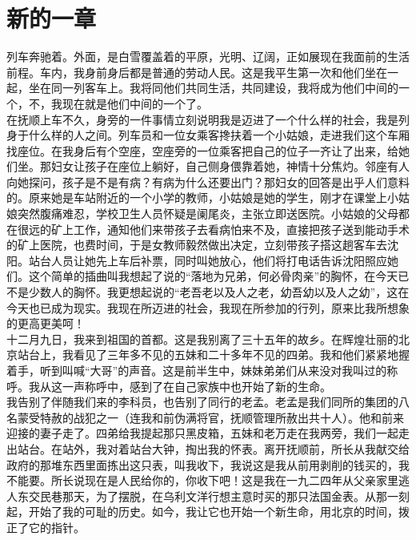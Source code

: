 \fancyhead[RO]{} %
\fancyhead[LE]{} %
\chapter*{新的一章}
\thispagestyle{empty}
列车奔驰着。外面，是白雪覆盖着的平原，光明、辽阔，正如展现在我面前的生活前程。车内，我身前身后都是普通的劳动人民。这是我平生第一次和他们坐在一起，坐在同一列客车上。我将同他们共同生活，共同建设，我将成为他们中间的一个，不，我现在就是他们中间的一个了。\\

在抚顺上车不久，身旁的一件事情立刻说明我是迈进了一个什么样的社会，我是列身于什么样的人之间。列车员和一位女乘客搀扶着一个小姑娘，走进我们这个车厢找座位。在我身后有个空座，空座旁的一位乘客把自己的位子一齐让了出来，给她们坐。那妇女让孩子在座位上躺好，自己侧身偎靠着她，神情十分焦灼。邻座有人向她探问，孩子是不是有病？有病为什么还要出门？那妇女的回答是出乎人们意料的。原来她是车站附近的一个小学的教师，小姑娘是她的学生，刚才在课堂上小姑娘突然腹痛难忍，学校卫生人员怀疑是阑尾炎，主张立即送医院。小姑娘的父母都在很远的矿上工作，通知他们来带孩子去看病怕来不及，直接把孩子送到能动手术的矿上医院，也费时间，于是女教师毅然做出决定，立刻带孩子搭这趟客车去沈阳。站台人员让她先上车后补票，同时叫她放心，他们将打电话告诉沈阳照应她们。这个简单的插曲叫我想起了说的“落地为兄弟，何必骨肉亲”的胸怀，在今天已不是少数人的胸怀。我更想起说的“老吾老以及人之老，幼吾幼以及人之幼”，这在今天也已成为现实。我现在所迈进的社会，我现在所参加的行列，原来比我所想象的更高更美呵！\\

十二月九日，我来到祖国的首都。这是我别离了三十五年的故乡。在辉煌壮丽的北京站台上，我看见了三年多不见的五妹和二十多年不见的四弟。我和他们紧紧地握着手，听到叫喊“大哥”的声音。这是前半生中，妹妹弟弟们从来没对我叫过的称呼。我从这一声称呼中，感到了在自己家族中也开始了新的生命。\\

我告别了伴随我们来的李科员，也告别了同行的老孟。老孟是我们同所的集团的八名蒙受特赦的战犯之一（连我和前伪满将官，抚顺管理所赦出共十人）。他和前来迎接的妻子走了。四弟给我提起那只黑皮箱，五妹和老万走在我两旁，我们一起走出站台。在站外，我对着站台大钟，掏出我的怀表。离开抚顺前，所长从我献交给政府的那堆东西里面拣出这只表，叫我收下，我说这是我从前用剥削的钱买的，我不能要。所长说现在是人民给你的，你收下吧！这是我在一九二四年从父亲家里逃人东交民巷那天，为了摆脱，在乌利文洋行想主意时买的那只法国金表。从那一刻起，开始了我的可耻的历史。如今，我让它也开始一个新生命，用北京的时间，拨正了它的指针。\\

